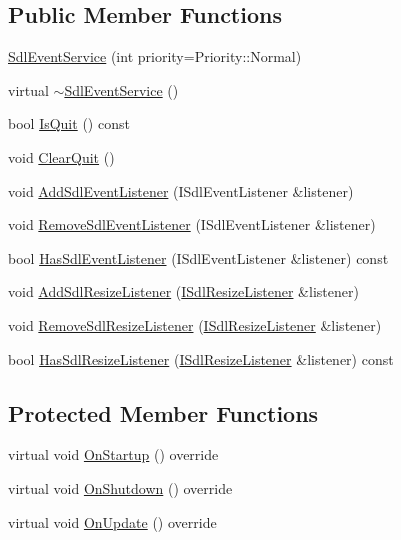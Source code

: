 \subsection*{Public Member Functions}
\begin{DoxyCompactItemize}
\item 
\hyperlink{classastu_1_1SdlEventService_a09280da649db883caffdb148791864e0}{Sdl\+Event\+Service} (int priority=Priority\+::\+Normal)
\item 
virtual \hyperlink{classastu_1_1SdlEventService_aeaf9a60c44bec12daed28882a5c2fe3f}{$\sim$\+Sdl\+Event\+Service} ()
\item 
bool \hyperlink{classastu_1_1SdlEventService_ac7b0eaae46bff34cc0d305a3dc3cea68}{Is\+Quit} () const
\item 
void \hyperlink{classastu_1_1SdlEventService_afe744162d9089344bfc32f6d65111ff6}{Clear\+Quit} ()
\item 
void \hyperlink{classastu_1_1SdlEventService_ab279fe046c27bf9b6468dfbd8df5ff20}{Add\+Sdl\+Event\+Listener} (I\+Sdl\+Event\+Listener \&listener)
\item 
void \hyperlink{classastu_1_1SdlEventService_ae3deae7488de012e7789662c314fd260}{Remove\+Sdl\+Event\+Listener} (I\+Sdl\+Event\+Listener \&listener)
\item 
bool \hyperlink{classastu_1_1SdlEventService_a81cdf292655cea80f022673d276b5375}{Has\+Sdl\+Event\+Listener} (I\+Sdl\+Event\+Listener \&listener) const
\item 
void \hyperlink{classastu_1_1SdlEventService_a54a2aba51c214090a484a743ccabf6f5}{Add\+Sdl\+Resize\+Listener} (\hyperlink{classastu_1_1ISdlResizeListener}{I\+Sdl\+Resize\+Listener} \&listener)
\item 
void \hyperlink{classastu_1_1SdlEventService_aeba11c482d2f1c7701a44f9dbbf917df}{Remove\+Sdl\+Resize\+Listener} (\hyperlink{classastu_1_1ISdlResizeListener}{I\+Sdl\+Resize\+Listener} \&listener)
\item 
bool \hyperlink{classastu_1_1SdlEventService_a0358addd25338f055f38912df3211ffa}{Has\+Sdl\+Resize\+Listener} (\hyperlink{classastu_1_1ISdlResizeListener}{I\+Sdl\+Resize\+Listener} \&listener) const
\end{DoxyCompactItemize}
\subsection*{Protected Member Functions}
\begin{DoxyCompactItemize}
\item 
virtual void \hyperlink{classastu_1_1SdlEventService_a71805a124600a23e48158daa5dc57fff}{On\+Startup} () override
\item 
virtual void \hyperlink{classastu_1_1SdlEventService_a0163bd191605b5068d93cd6c8f26da0c}{On\+Shutdown} () override
\item 
virtual void \hyperlink{classastu_1_1SdlEventService_a67090f42250433506b8bfb4254df9e50}{On\+Update} () override
\end{DoxyCompactItemize}
